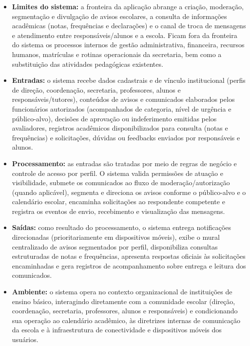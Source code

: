 \documentclass[a4paper,12pt]{report}
\begin{document}
\begin{itemize}
    \item \textbf{Limites do sistema:} a fronteira da aplicação abrange a criação, moderação, segmentação e divulgação de avisos escolares, a consulta de informações acadêmicas (notas, frequências e declarações) e o canal de troca de mensagens e atendimento entre responsáveis/alunos e a escola. Ficam fora da fronteira do sistema os processos internos de gestão administrativa, financeira, recursos humanos, matrículas e rotinas operacionais da secretaria, bem como a substituição das atividades pedagógicas existentes.
    
    \item \textbf{Entradas:} o sistema recebe dados cadastrais e de vínculo institucional (perfis de direção, coordenação, secretaria, professores, alunos e responsáveis/tutores), conteúdos de avisos e comunicados elaborados pelos funcionários autorizados (acompanhados de categoria, nível de urgência e público-alvo), decisões de aprovação ou indeferimento emitidas pelos avaliadores, registros acadêmicos disponibilizados para consulta (notas e frequências) e solicitações, dúvidas ou feedbacks enviados por responsáveis e alunos.
    
    \item \textbf{Processamento:} as entradas são tratadas por meio de regras de negócio e controle de acesso por perfil. O sistema valida permissões de atuação e visibilidade, submete os comunicados ao fluxo de moderação/autorização (quando aplicável), segmenta e direciona os avisos conforme o público-alvo e o calendário escolar, encaminha solicitações ao respondente competente e registra os eventos de envio, recebimento e visualização das mensagens.
    
    \item \textbf{Saídas:} como resultado do processamento, o sistema entrega notificações direcionadas (prioritariamente em dispositivos móveis), exibe o mural centralizado de avisos segmentados por perfil, disponibiliza consultas estruturadas de notas e frequências, apresenta respostas oficiais às solicitações encaminhadas e gera registros de acompanhamento sobre entrega e leitura dos comunicados.
    
    \item \textbf{Ambiente:} o sistema opera no contexto organizacional de instituições de ensino básico, interagindo diretamente com a comunidade escolar (direção, coordenação, secretaria, professores, alunos e responsáveis) e condicionando sua operação ao calendário acadêmico, às diretrizes internas de comunicação da escola e à infraestrutura de conectividade e dispositivos móveis dos usuários.
    

\end{itemize}
\end{document}
